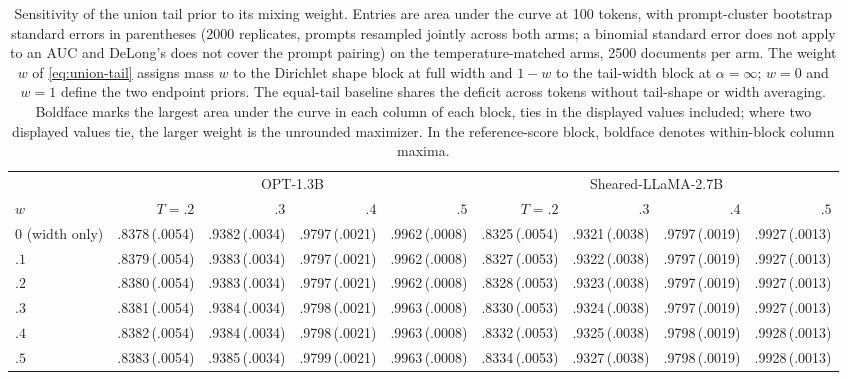 \documentclass[11pt]{article}
\newcommand{\mcse}[2]{\mbox{#1\,{\fontsize{7}{8}\selectfont(#2)}}}
\begin{document}
\begin{table}[htbp]
\centering
\scriptsize
\setlength{\tabcolsep}{3pt}%
\caption{Sensitivity of the union tail prior to its mixing weight.  Entries are area under the curve at 100 tokens, with prompt-cluster bootstrap standard errors in parentheses (2000 replicates, prompts resampled jointly across both arms; a binomial standard error does not apply to an AUC and DeLong's does not cover the prompt pairing) on the temperature-matched arms, 2500 documents per arm.  The weight $w$ of \eqref{eq:union-tail} assigns mass $w$ to the Dirichlet shape block at full width and $1-w$ to the tail-width block at $\alpha=\infty$; $w=0$ and $w=1$ define the two endpoint priors.  The equal-tail baseline shares the deficit across tokens without tail-shape or width averaging.  Boldface marks the largest area under the curve in each column of each block, ties in the displayed values included; where two displayed values tie, the larger weight is the unrounded maximizer.  In the reference-score block, boldface denotes within-block column maxima.}
\label{tab:union-weight}
\begin{tabular}{@{}lrrrrrrrr@{}}
\toprule
& \multicolumn{4}{c}{OPT-1.3B} & \multicolumn{4}{c}{Sheared-LLaMA-2.7B} \\
\cmidrule(lr){2-5}\cmidrule(lr){6-9}
$w$ & $T{=}.2$ & $.3$ & $.4$ & $.5$ & $T{=}.2$ & $.3$ & $.4$ & $.5$ \\
\midrule
$0$ (width only) & \mcse{.8378}{.0054} & \mcse{.9382}{.0034} & \mcse{.9797}{.0021} & \mcse{.9962}{.0008} & \mcse{.8325}{.0054} & \mcse{.9321}{.0038} & \mcse{.9797}{.0019} & \mcse{.9927}{.0013} \\
$.1$ & \mcse{.8379}{.0054} & \mcse{.9383}{.0034} & \mcse{.9797}{.0021} & \mcse{.9962}{.0008} & \mcse{.8327}{.0053} & \mcse{.9322}{.0038} & \mcse{.9797}{.0019} & \mcse{.9927}{.0013} \\
$.2$ & \mcse{.8380}{.0054} & \mcse{.9383}{.0034} & \mcse{.9797}{.0021} & \mcse{.9962}{.0008} & \mcse{.8328}{.0053} & \mcse{.9323}{.0038} & \mcse{.9797}{.0019} & \mcse{.9927}{.0013} \\
$.3$ & \mcse{.8381}{.0054} & \mcse{.9384}{.0034} & \mcse{.9798}{.0021} & \mcse{.9963}{.0008} & \mcse{.8330}{.0053} & \mcse{.9324}{.0038} & \mcse{.9797}{.0019} & \mcse{.9927}{.0013} \\
$.4$ & \mcse{.8382}{.0054} & \mcse{.9384}{.0034} & \mcse{.9798}{.0021} & \mcse{.9963}{.0008} & \mcse{.8332}{.0053} & \mcse{.9325}{.0038} & \mcse{.9798}{.0019} & \mcse{.9928}{.0013} \\
$.5$ & \mcse{.8383}{.0054} & \mcse{.9385}{.0034} & \mcse{.9799}{.0021} & \mcse{.9963}{.0008} & \mcse{.8334}{.0053} & \mcse{.9327}{.0038} & \mcse{.9798}{.0019} & \mcse{.9928}{.0013} \\

\end{tabular}
\end{table}
\end{document}
